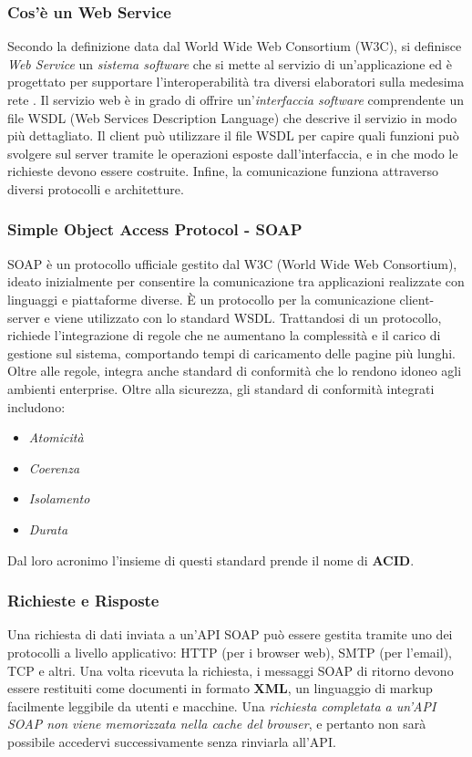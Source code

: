 \subsubsection{Cos'è un Web Service}
Secondo la definizione data dal World Wide Web Consortium (W3C), si definisce \emph{Web Service} un \emph{sistema software} che si mette al servizio di un'applicazione ed è progettato per supportare l'interoperabilità tra diversi elaboratori sulla medesima rete \cite{w3c:webservices}. Il servizio web è in grado di offrire un’\textit{interfaccia software} comprendente un file WSDL (Web Services Description Language) che descrive il servizio in modo più dettagliato. Il client può utilizzare il file WSDL per capire quali funzioni può svolgere sul server tramite le operazioni esposte dall'interfaccia, e in che modo le richieste devono essere costruite. Infine, la comunicazione funziona attraverso diversi protocolli e architetture. 

\subsubsection{Simple Object Access Protocol - SOAP}
SOAP è un protocollo ufficiale gestito dal W3C (World Wide Web Consortium), ideato inizialmente per consentire la comunicazione tra applicazioni realizzate con linguaggi e piattaforme diverse. È un protocollo per la comunicazione client-server e viene utilizzato con lo standard WSDL. Trattandosi di un protocollo, richiede l'integrazione di regole che ne aumentano la complessità e il carico di gestione sul sistema, comportando tempi di caricamento delle pagine più lunghi. Oltre alle regole, integra anche standard di conformità che lo rendono idoneo agli ambienti enterprise. Oltre alla sicurezza, gli standard di conformità integrati includono: 
\begin{itemize}
    \item \emph{Atomicità}
    \item \emph{Coerenza}
    \item \emph{Isolamento}
    \item \emph{Durata}
\end{itemize}
Dal loro acronimo l'insieme di questi standard prende il nome di \textbf{ACID}.

\subsubsection{Richieste e Risposte}
Una richiesta di dati inviata a un'API SOAP può essere gestita tramite uno dei protocolli a livello applicativo: HTTP (per i browser web), SMTP (per l'email), TCP e altri. Una volta ricevuta la richiesta, i messaggi SOAP di ritorno devono essere restituiti come documenti in formato \textbf{XML}, un linguaggio di markup facilmente leggibile da utenti e macchine. Una \textit{richiesta completata a un'API SOAP non viene memorizzata nella cache del browser}, e pertanto non sarà possibile accedervi successivamente senza rinviarla all'API.

